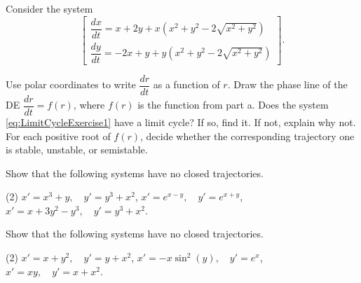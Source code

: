 \documentclass{ximera}
\begin{document}
\begin{exercise}
    Consider the system %
    \begin{equation}
        \begin{bmatrix}
            \dfrac{dx}{dt}=x+2y+x(x^2+y^2-2\sqrt{x^2+y^2})\\[6pt]
            \dfrac{dy}{dt}=-2x+y+y(x^2+y^2-2\sqrt{x^2+y^2})
        \end{bmatrix}. \label{eq:LimitCycleExercise1}
    \end{equation}
    \begin{tasks}
        \task Use polar coordinates to write $\dfrac{dr}{dt}$ as a function of $r$.
        \task Draw the phase line of the DE $\dfrac{dr}{dt}=f(r)$, where $f(r)$ is the function from part a.
        \task Does the system \eqref{eq:LimitCycleExercise1} have a limit cycle? If so, find it. If not, explain why not. For each positive root of $f(r)$, decide whether the corresponding trajectory one is stable, unstable, or semistable.
    \end{tasks}
\end{exercise}

\begin{exercise}
    Show that the following systems have no closed trajectories.
    \begin{tasks}(2)
        \task $x'=x^3+y,\quad y'=y^3+x^2$,
        \task $x'=e^{x-y},\quad y'=e^{x+y}$,
        \task $x'=x+3y^2-y^3,\quad y'=y^3+x^2$.
    \end{tasks}
\end{exercise}

\begin{exercise}%
    Show that the following systems have no closed trajectories.
    \begin{tasks}(2)
        \task $x'=x+y^2,\quad y'=y+x^2$,
        \task $x'=-x\sin^2(y),\quad y'=e^x$,
        \task $x'=xy,\quad y'=x+x^2$.
    \end{tasks}
\end{exercise}
\end{document}
